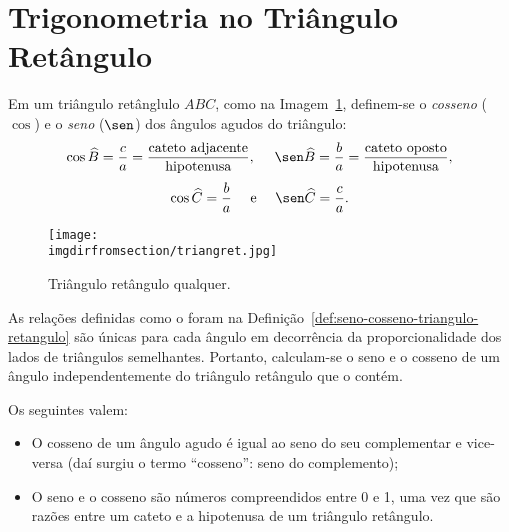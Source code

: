 \section{Trigonometria no Triângulo Retângulo}

\begin{definition}
\label{def:seno-cosseno-triangulo-retangulo}
Em um triângulo retânglulo $ABC$, como na Imagem~\ref{fig:triangulo-retangulo}, definem-se o
\emph{cosseno} ($\cos$) e o \emph{seno} ($\sen$) dos ângulos agudos do
triângulo:
%
$$\cos \widehat B = \frac c a = \frac {\text{cateto
adjacente}}{\text{hipotenusa}}, \ \ \ \ \sen \widehat B = \frac b a = \frac
{\text{cateto oposto}}{\text{hipotenusa}},$$
$$\cos \widehat C = \frac b a \ \ \ \ \text{e} \ \ \ \ \sen \widehat
C = \frac c a.$$    
%
\begin{figure}[H]
\centering
\texttt{[image: \\imgdirfromsection/triangret.jpg]}
\caption{Triângulo retângulo qualquer.}
\label{fig:triangulo-retangulo}
\end{figure}
\end{definition}

\begin{remark}
As relações definidas como o foram na Definição~\ref{def:seno-cosseno-triangulo-retangulo} são únicas para cada ângulo em
decorrência da proporcionalidade dos lados de triângulos
semelhantes. Portanto, calculam-se o seno e o cosseno de um ângulo
independentemente do triângulo retângulo que o contém.
\end{remark}

\begin{proposition}
Os seguintes valem:
\begin{itemize}
	\item O cosseno de um ângulo agudo é igual ao seno do seu
	complementar e vice-versa (daí surgiu o termo ``cosseno'': seno do complemento);
	\item O seno e o cosseno são números compreendidos entre 0 e 1, uma vez que são razões entre um cateto 
	e a hipotenusa de um triângulo retângulo.
\end{itemize}
\end{proposition}

